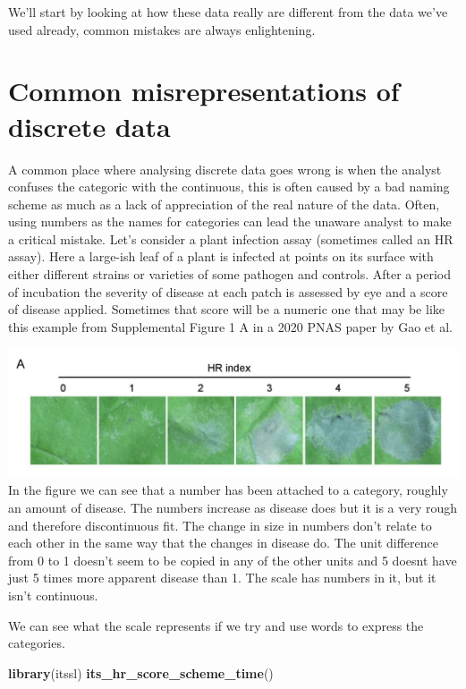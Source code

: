 \documentclass[
]{book}
\newenvironment{Shaded}{\begin{snugshade}}{\end{snugshade}}
\newcommand{\KeywordTok}[1]{\textcolor[rgb]{0.13,0.29,0.53}{\textbf{#1}}}
\newcommand{\NormalTok}[1]{#1}
\begin{document}
We'll start by looking at how these data really are different from the data we've used already, common mistakes are always enlightening.

\hypertarget{common-misrepresentations-of-discrete-data}{%
\section{Common misrepresentations of discrete data}\label{common-misrepresentations-of-discrete-data}}

A common place where analysing discrete data goes wrong is when the analyst confuses the categoric with the continuous, this is often caused by a bad naming scheme as much as a lack of appreciation of the real nature of the data. Often, using numbers as the names for categories can lead the unaware analyst to make a critical mistake. Let's consider a plant infection assay (sometimes called an HR assay). Here a large-ish leaf of a plant is infected at points on its surface with either different strains or varieties of some pathogen and controls. After a period of incubation the severity of disease at each patch is assessed by eye and a score of disease applied. Sometimes that score will be a numeric one that may be like this example from Supplemental Figure 1 A in a 2020 PNAS paper by Gao et al.~\citet{Gao9613}

\includegraphics{fig/dong_figs1A.png}
In the figure we can see that a number has been attached to a category, roughly an amount of disease. The numbers increase as disease does but it is a very rough and therefore discontinuous fit. The change in size in numbers don't relate to each other in the same way that the changes in disease do. The unit difference from 0 to 1 doesn't seem to be copied in any of the other units and 5 doesnt have just 5 times more apparent disease than 1. The scale has numbers in it, but it isn't continuous.

We can see what the scale represents if we try and use words to express the categories.

\begin{Shaded}
\begin{Highlighting}[]
\KeywordTok{library}\NormalTok{(itssl)}
\KeywordTok{its_hr_score_scheme_time}\NormalTok{()}
\end{Highlighting}
\end{Shaded}
\end{document}
